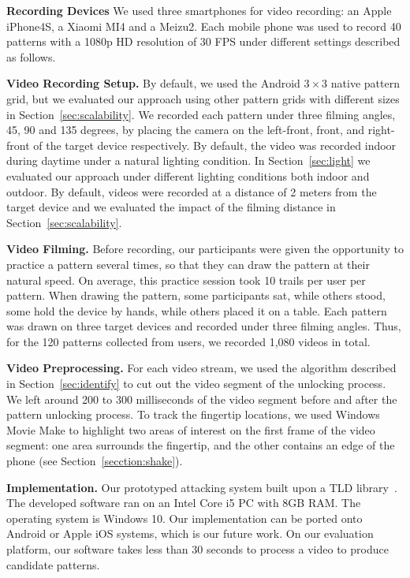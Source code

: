     \vspace{2mm}
    \noindent\textbf{Recording Devices} We used three smartphones for video recording: an Apple iPhone4S,
     a Xiaomi MI4 and a Meizu2. Each mobile phone was used to record 40 patterns with a
    1080p HD resolution of 30 FPS under different settings described as follows.

    \vspace{2mm}
   \noindent\textbf{Video Recording Setup.}
    By default, we used the  Android $3 \times 3$ native pattern grid,
    but we evaluated our approach using other pattern grids with different sizes in
    Section~\ref{sec:scalability}. We recorded each pattern under three filming
    angles, 45, 90 and 135 degrees, by placing the camera on the left-front, front, and right-front
    of the target device respectively.
    By default, the video
    was recorded indoor during daytime under a natural lighting condition. In
    Section~\ref{sec:light} we evaluated our approach under different lighting conditions
    both indoor and outdoor. By default, videos were recorded at a distance of
    2 meters from the target device and we evaluated the impact of the filming distance in
    Section~\ref{sec:scalability}.

    \vspace{2mm}
    \noindent \textbf{Video Filming.}
     Before recording, our participants were given the opportunity to practice a pattern
    several times, so that they can draw the pattern at
    their natural speed. On average, this practice session took 10 trails per user per pattern.
    When drawing the
    pattern, some participants sat, while others stood, some hold the device
    by hands, while others placed it on a table.
    Each pattern was drawn on three target devices and
    recorded under three filming angles. Thus, for the 120 patterns collected from users, we recorded 1,080 videos in total.

    \vspace{2mm}
    \noindent\textbf{Video Preprocessing.}
    For each video stream, we used the algorithm described in Section~\ref{sec:identify} to cut out the video segment
    of the unlocking process. We left around 200 to 300 milliseconds of the video segment before and after the pattern unlocking process.
    To track the fingertip locations,
    we used Windows Movie Make to highlight two areas of interest on the first frame of
    the video segment: one area surrounds the fingertip, and the other contains an edge of the
    phone (see Section~\ref {secction:shake}).

    \vspace{2mm}
   \noindent\textbf{Implementation.} Our prototyped attacking system built upon a TLD library~\cite{TLD-toolbox-web}.
    The developed software ran on an Intel Core i5 PC with
    8GB RAM. The operating system is Windows 10. Our implementation can be ported onto
    Android or Apple iOS systems, which is our future work. On our evaluation
    platform, our software takes less than 30 seconds to process a video to produce candidate patterns.
